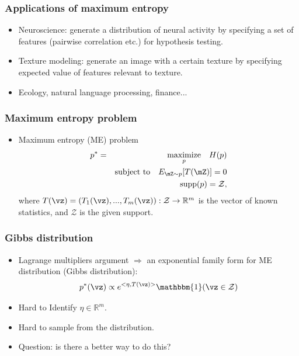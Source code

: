 \documentclass[16pt,presentation]{beamer}
\begin{document}
\begin{frame}
\frametitle{Applications of maximum entropy}
\begin{itemize}
\item \alert{Neuroscience}: generate a distribution of neural activity by specifying a set of features (pairwise correlation etc.) for hypothesis testing.
\item \alert{Texture modeling}: generate an image with a certain texture by specifying expected value of features relevant to texture.
\item Ecology, natural language processing, finance...
\end{itemize}
\end{frame}

\begin{frame}
\frametitle{Maximum entropy problem}
\begin{itemize}
\item Maximum entropy (ME) problem
\begin{eqnarray*}
p^{*} &=& \underset{p}{\text{maximize}}~~~ H(p) \\
&& \text{subject to} ~~~E_{\mZ\sim p}[T(\mZ)]=0 \nonumber\\
&& ~~~~~~~~~~~~~~~~~~\supp(p)=\mathcal{Z} \nonumber,
\end{eqnarray*}
where $T(\vz) = (T_1(\vz),...,T_m(\vz)):\mathcal{Z}\rightarrow \mathbb{R}^{m}$ is the vector of known statistics, and $\mathcal{Z}$ is the given support.
\end{itemize}
\end{frame}

\begin{frame}
\frametitle{Gibbs distribution}
\begin{itemize}
\item Lagrange multipliers argument $\Rightarrow$ an exponential family form for ME distribution (Gibbs distribution):
\[\label{curmet}
p^*(\vz) \propto e^{<\eta, T(\vz)>} \mathbbm{1}(\vz \in \mathcal{Z})
\]
\item Hard to Identify $\eta \in \mathbb{R}^m$.
\item Hard to sample from the distribution.
\item \alert{Question}: is there a better way to do this?
\end{itemize}
\end{frame}
\end{document}

